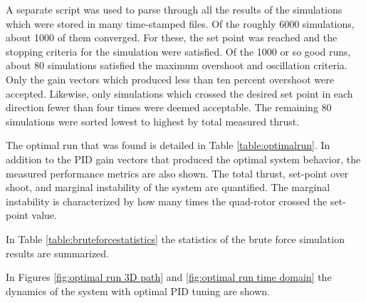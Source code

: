 A separate script was used to parse through all the results of the simulations which were stored in many time-stamped files. Of the roughly 6000 simulations, about 1000 of them converged. For these, the set point was reached and the stopping criteria for the simulation were satisfied. Of the 1000 or so good runs, about 80 simulations satisfied the maximum overshoot and oscillation criteria. Only the gain vectors which produced less than ten percent overshoot were accepted. Likewise, only simulations which crossed the desired set point in each direction fewer than four times were deemed acceptable. The remaining 80 simulations were sorted lowest to highest by total measured thrust.

The optimal run that was found is detailed in Table \ref{table:optimalrun}.  In addition to the PID gain vectors that produced the optimal system behavior, the measured performance metrics are also shown. The total thrust, set-point over shoot, and marginal instability of the system are quantified. The marginal instability is characterized by how many times the quad-rotor crossed the set-point value.

In Table \ref{table:bruteforcestatistics} the statistics of the brute force simulation results are summarized.

In Figures \ref{fig:optimal run 3D path} and \ref{fig:optimal run time domain} the dynamics of the system with optimal PID tuning are shown.


